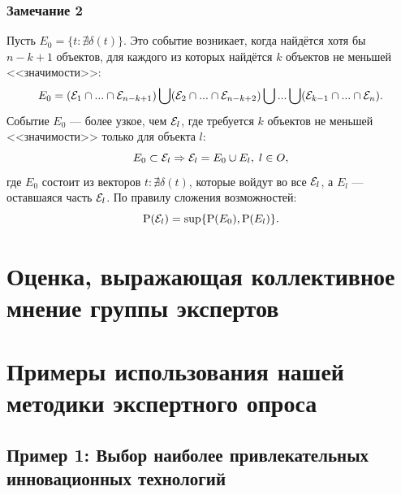 \documentclass{article}
\begin{document}
\subsubsection*{Замечание 2}
Пусть $E_0 = \{t: \nexists \delta(t)\}$. Это событие возникает, когда найдётся хотя бы $n-k+1$ объектов, для каждого из которых найдётся $k$ объектов не меньшей <<значимости>>:
\begin{equation*}
 E_0 = (\mathcal{E}_1 \cap ... \cap \mathcal{E}_{n-k+1}) \bigcup (\mathcal{E}_2 \cap ... \cap \mathcal{E}_{n-k+2}) \bigcup ... \bigcup (\mathcal{E}_{k-1} \cap ... \cap \mathcal{E}_{n}).
\end{equation*}
Событие $E_0$ --- более узкое, чем $\mathcal{E}_l$, где требуется $k$ объектов не меньшей <<значимости>> только для объекта $l$:
\begin{equation*}
 E_0 \subset \mathcal{E}_l \Rightarrow \mathcal{E}_l = E_0 \cup E_l,\;l \in O,
\end{equation*}
где $E_0$ состоит из векторов $t: \nexists \delta(t)$, которые войдут во все $\mathcal{E}_l$, а 
$E_l$ --- оставшаяся часть $\mathcal{E}_l$. По правилу сложения возможностей:
\begin{equation*}
 {\mathrm{P}}(\mathcal{E}_l) = \sup\{{\mathrm{P}}(E_0), {\mathrm{P}}(E_l)\}.
\end{equation*}

\section{Оценка, выражающая коллективное мнение группы экспертов}

\section{Примеры использования нашей методики экспертного опроса}
\subsection{Пример 1: Выбор наиболее привлекательных инновационных технологий}
\end{document}
